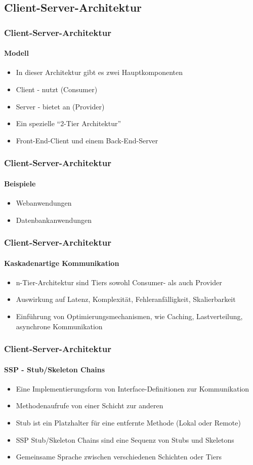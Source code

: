 \subsection{Client-Server-Architektur}
\begin{frame}
  \frametitle{Client-Server-Architektur}
  \framesubtitle{Modell}
  \begin{itemize}
    \item In dieser Architektur gibt es zwei Hauptkomponenten
    \item Client - nutzt (Consumer)
    \item Server - bietet an (Provider)
    \item Ein spezielle \enquote{2-Tier Architektur}
    \item Front-End-Client und einem Back-End-Server
  \end{itemize}
\end{frame}

\begin{frame}
  \frametitle{Client-Server-Architektur}
  \framesubtitle{Beispiele}
  \begin{itemize}
    \item Webanwendungen
    \item Datenbankanwendungen
  \end{itemize}
\end{frame}

\begin{frame}
  \frametitle{Client-Server-Architektur}
  \framesubtitle{Kaskadenartige Kommunikation}
  \begin{itemize}
    \item n-Tier-Architektur sind Tiers sowohl Consumer- als auch Provider
    \item Auswirkung auf Latenz, Komplexität, Fehleranfälligkeit, Skalierbarkeit
    \item Einführung von Optimierungsmechanismen, wie Caching, Lastverteilung, asynchrone Kommunikation 
  \end{itemize}
\end{frame}

\begin{frame}
  \frametitle{Client-Server-Architektur}
  \framesubtitle{SSP - Stub/Skeleton Chains}
  \begin{itemize}
    \item Eine Implementierungsform von Interface-Definitionen zur Kommunikation
    \item Methodenaufrufe von einer Schicht zur anderen
    \item Stub ist ein Platzhalter für eine entfernte Methode (Lokal oder Remote)
    \item SSP Stub/Skeleton Chains sind eine Sequenz von Stubs und Skeletons
    \item Gemeinsame Sprache zwischen verschiedenen Schichten oder Tiers
  \end{itemize}
\end{frame}